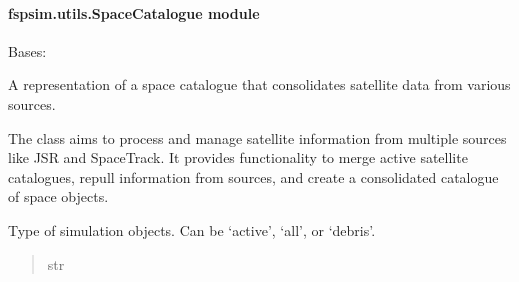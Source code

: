 \documentclass[letterpaper,10pt,english]{sphinxmanual}
\begin{document}
\paragraph{fspsim.utils.SpaceCatalogue module}
\label{\detokenize{fspsim.utils:module-fspsim.utils.SpaceCatalogue}}\label{\detokenize{fspsim.utils:fspsim-utils-spacecatalogue-module}}

\begin{fulllineitems}
\label{\detokenize{fspsim.utils:fspsim.utils.SpaceCatalogue.SpaceCatalogue}}
\pysigstartsignatures
{}
\pysigstopsignatures
\sphinxAtStartPar
Bases: 

\sphinxAtStartPar
A representation of a space catalogue that consolidates satellite data from various sources.

\sphinxAtStartPar
The class aims to process and manage satellite information from multiple sources like JSR and SpaceTrack.
It provides functionality to merge active satellite catalogues, repull information from sources,
and create a consolidated catalogue of space objects.

\begin{fulllineitems}
\label{\detokenize{fspsim.utils:fspsim.utils.SpaceCatalogue.SpaceCatalogue.sim_object_type}}
\pysigstartsignatures
{}
\pysigstopsignatures
\sphinxAtStartPar
Type of simulation objects. Can be ‘active’, ‘all’, or ‘debris’.
\begin{quote}\begin{description}
\sphinxAtStartPar
str

\end{description}\end{quote}


\end{fulllineitems}
\end{fulllineitems}
\end{document}

